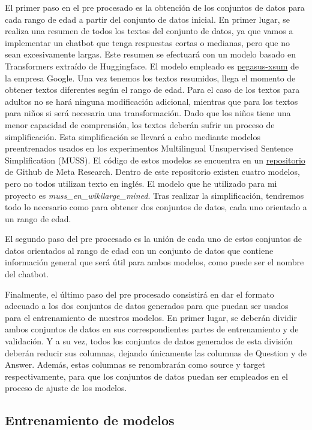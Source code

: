 El primer paso en el pre procesado es la obtención de los conjuntos de datos para cada rango de edad a partir del conjunto de datos inicial. En primer lugar, se realiza una resumen de todos los textos del conjunto de datos, ya que vamos a implementar un chatbot que tenga respuestas cortas o medianas, pero que no sean excesivamente largas. Este resumen se efectuará con un modelo basado en Transformers extraído de Huggingface. El modelo empleado es \href{https://huggingface.co/google/pegasus-xsum}{pegasus-xsum} de la empresa Google. Una vez tenemos los textos resumidos, llega el momento de obtener textos diferentes según el rango de edad. Para el caso de los textos para adultos no se hará ninguna modificación adicional, mientras que para los textos para niños si será necesaria una transformación. Dado que los niños tiene una menor capacidad de comprensión, los textos deberán sufrir un proceso de simplificación. Esta simplificación se llevará a cabo mediante modelos preentrenados usados en los experimentos Multilingual Unsupervised Sentence Simplification (MUSS). El código de estos modelos se encuentra en un \href{https://github.com/facebookresearch/muss}{repositorio} de Github de Meta Research. Dentro de este repositorio existen cuatro modelos, pero no todos utilizan texto en inglés. El modelo que he utilizado para mi proyecto es \textit{muss\_en\_wikilarge\_mined}. Tras realizar la simplificación, tendremos todo lo necesario como para obtener dos conjuntos de datos, cada uno orientado a un rango de edad.

El segundo paso del pre procesado es la unión de cada uno de estos conjuntos de datos orientados al rango de edad con un conjunto de datos que contiene información general que será útil para ambos modelos, como puede ser el nombre del chatbot.

Finalmente, el último paso del pre procesado consistirá en dar el formato adecuado a los dos conjuntos de datos generados para que puedan ser usados para el entrenamiento de nuestros modelos. En primer lugar, se deberán dividir ambos conjuntos de datos en sus correspondientes partes de entrenamiento y de validación. Y a su vez, todos los conjuntos de datos generados de esta división deberán reducir sus columnas, dejando únicamente las columnas de Question y de Answer. Además, estas columnas se renombrarán como source y target respectivamente, para que los conjuntos de datos puedan ser empleados en el proceso de ajuste de los modelos.

\subsection{Entrenamiento de modelos}

